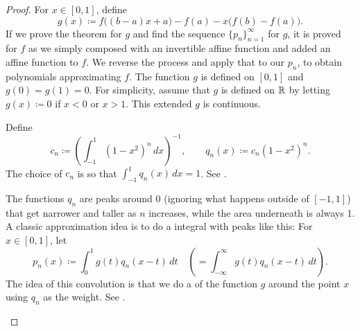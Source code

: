 \begin{proof}
For $x \in [0,1]$,
define
\begin{equation*}
g(x) \coloneqq f\bigl((b-a)x+a\bigr)-f(a) - x\bigl(f(b)-f(a)\bigr) .
\end{equation*}
If we prove the theorem for $g$ and find the sequence
$\{ p_n \}_{n=1}^\infty$ for $g$,
it is proved for $f$ as we simply
composed with an invertible affine function and added an affine
function to $f$.  We reverse the process and apply that to our
$p_n$, to obtain polynomials approximating $f$.
The function $g$ is defined on $[0,1]$ and $g(0)=g(1)=0$.
For simplicity, assume that
$g$ is defined on ${\mathbb{R}}$ by letting
$g(x) \coloneqq 0$ if $x < 0$ or $x > 1$.  This extended $g$ is continuous.

Define
\begin{equation*}
c_n \coloneqq {\left( \int_{-1}^1 {(1-x^2)}^n\,dx \right)}^{-1} ,
\qquad
q_n(x) \coloneqq c_n (1-x^2)^n .
\end{equation*}
The choice of $c_n$ is
so that $\int_{-1}^1 q_n(x)\,dx = 1$.
See .

\begin{myfigureht}
\caption{Plot of the approximate delta functions $q_n$ on $[-1,1]$ for
$n=5,10,15,20,\ldots,100$ with higher $n$ in fainter gray.\label{fig:weierqn}}
\end{myfigureht}

The functions $q_n$ are peaks around 0 (ignoring what happens outside
of $[-1,1]$) that get narrower and taller as $n$ increases,
while the area underneath is always 1.
A classic approximation idea
is to do a \emph{} integral with peaks like this:
For $x \in [0,1]$, let
\begin{equation*}
p_n(x) \coloneqq \int_{0}^1 g(t)q_n(x-t) \,dt \quad \left( = \int_{-\infty}^\infty
g(t)q_n(x-t) \,dt \right) .
\end{equation*}
The idea of this convolution is that we do a  of the
function $g$ around the point $x$ using $q_n$ as the weight.
See .

\begin{myfigureht}
\caption{For $x=0.3$, the plot of $q_{100}(x-t)$ (faint gray peak centered
at $x$), some continuous function
$g(t)$ (the jagged line) and the product $g(t)q_{100}(x-t)$ (the bold line).\label{fig:approxdeltaconv}}
\end{myfigureht}


\end{proof}
